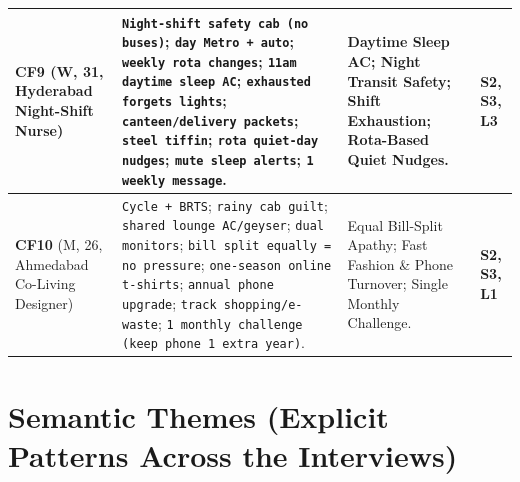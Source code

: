 \documentclass[12pt, a4paper]{article}
\begin{document}
{\begin{longtable}{|>{\raggedright\arraybackslash}p{3.0cm}|>{\raggedright\arraybackslash}p{7.1cm}|>{\raggedright\arraybackslash}p{3.7cm}|>{\raggedright\arraybackslash}p{1.9cm}|}
\textbf{CF9} \cite{cf9} (W, 31, Hyderabad Night-Shift Nurse) & 
\texttt{Night-shift safety cab (no buses)}; \texttt{day Metro + auto}; \texttt{weekly rota changes}; \texttt{11am daytime sleep AC}; \texttt{exhausted forgets lights}; \texttt{canteen/delivery packets}; \texttt{steel tiffin}; \texttt{rota quiet-day nudges}; \texttt{mute sleep alerts}; \texttt{1 weekly message}. & 
Daytime Sleep AC; Night Transit Safety; Shift Exhaustion; Rota-Based Quiet Nudges. & 
\textbf{S2, S3, L3} \\
\hline

\textbf{CF10} \cite{cf10} (M, 26, Ahmedabad Co-Living Designer) & 
\texttt{Cycle + BRTS}; \texttt{rainy cab guilt}; \texttt{shared lounge AC/geyser}; \texttt{dual monitors}; \texttt{bill split equally = no pressure}; \texttt{one-season online t-shirts}; \texttt{annual phone upgrade}; \texttt{track shopping/e-waste}; \texttt{1 monthly challenge (keep phone 1 extra year)}. & 
Equal Bill-Split Apathy; Fast Fashion \& Phone Turnover; Single Monthly Challenge. & 
\textbf{S2, S3, L1} \\
\hline
\end{longtable}
}

\section{Semantic Themes (Explicit Patterns Across the Interviews)}
\end{document}
